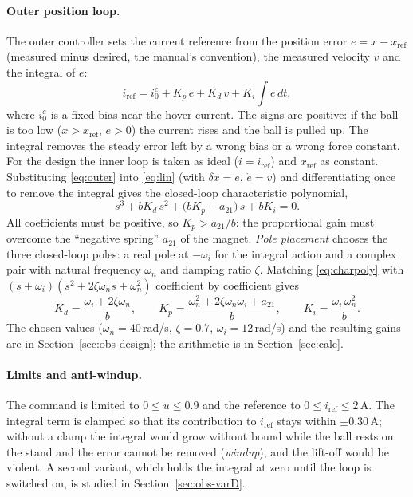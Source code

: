 \documentclass[11pt,a4paper]{article}
\begin{document}
\paragraph{Outer position loop.} The outer controller sets the current reference from the position error
$e = x - x_{\mathrm{ref}}$ (measured minus desired, the manual's convention), the measured velocity $v$ and the
integral of $e$:
\begin{equation}
i_{\mathrm{ref}} = i_0^{c} + K_p\,e + K_d\,v + K_i \int e\,dt ,
\label{eq:outer}
\end{equation}
where $i_0^{c}$ is a fixed bias near the hover current. The signs are positive: if the ball is too low ($x>x_{\mathrm{ref}}$,
$e>0$) the current rises and the ball is pulled up. The integral removes the steady error left by a wrong bias or a
wrong force constant. For the design the inner loop is taken as ideal ($i = i_{\mathrm{ref}}$) and $x_{\mathrm{ref}}$ as
constant. Substituting \eqref{eq:outer} into \eqref{eq:lin} (with $\delta x = e$, $\dot e = v$) and differentiating once
to remove the integral gives the closed-loop characteristic polynomial,
\begin{equation}
s^3 + b K_d\, s^2 + \bigl(b K_p - a_{21}\bigr)\, s + b K_i = 0 .
\label{eq:charpoly}
\end{equation}
All coefficients must be positive, so $K_p > a_{21}/b$: the proportional gain must overcome the ``negative spring'' $a_{21}$
of the magnet. \emph{Pole placement} chooses the three closed-loop poles: a real pole at $-\omega_i$ for the integral
action and a complex pair with natural frequency $\omega_n$ and damping ratio $\zeta$. Matching
\eqref{eq:charpoly} with $(s+\omega_i)(s^2+2\zeta\omega_n s+\omega_n^2)$ coefficient by coefficient gives
\begin{equation}
K_d = \frac{\omega_i + 2\zeta\omega_n}{b}, \qquad
K_p = \frac{\omega_n^2 + 2\zeta\omega_n\omega_i + a_{21}}{b}, \qquad
K_i = \frac{\omega_i\,\omega_n^2}{b}.
\label{eq:gains}
\end{equation}
The chosen values ($\omega_n = 40$\,rad/s, $\zeta=0.7$, $\omega_i = 12$\,rad/s) and the resulting gains are in
Section~\ref{sec:obs-design}; the arithmetic is in Section~\ref{sec:calc}.

\paragraph{Limits and anti-windup.} The command is limited to $0 \le u \le 0.9$ and the reference to
$0 \le i_{\mathrm{ref}} \le 2$\,A. The integral term is clamped so that its contribution to $i_{\mathrm{ref}}$ stays within
$\pm0.30$\,A; without a clamp the integral would grow without bound while the ball rests on the stand and the error
cannot be removed (\emph{windup}), and the lift-off would be violent. A second variant, which holds the integral at
zero until the loop is switched on, is studied in Section~\ref{sec:obs-varD}.
\end{document}
